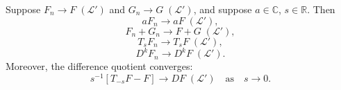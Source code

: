 Suppose $F_n \rightarrow F \; (\mathcal{L}')$ and $G_n \rightarrow G \; (\mathcal{L}')$, and suppose $a \in \mathbb{C}$, $s \in \mathbb{R}$. Then
$$aF_n \rightarrow aF \; (\mathcal{L}'),$$
$$F_n + G_n \rightarrow F + G \; (\mathcal{L}'),$$
$$T_s F_n \rightarrow T_s F \; (\mathcal{L}'),$$
$$D^k F_n \rightarrow D^k F \; (\mathcal{L}').$$
Moreover, the difference quotient converges:
$$s^{-1}[T_{-s}F - F] \rightarrow DF \; (\mathcal{L}') \quad \text{as} \quad s \rightarrow 0.$$
